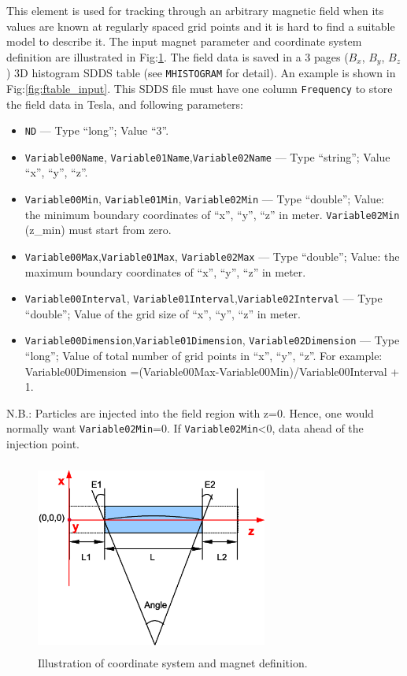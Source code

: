 This element is used for tracking through an arbitrary magnetic field
when its values are known at regularly spaced grid points and it is
hard to find a suitable model to describe it. The input magnet
parameter and coordinate system definition are illustrated in
Fig:\ref{fig:ftable_mag}. The field data is saved in a 3 pages ($B_x$,
$B_y$, $B_z$) 3D histogram SDDS table (see \verb|MHISTOGRAM| for detail).
An example is shown in Fig:\ref{fig:ftable_input}.
This SDDS file must have one column \verb|Frequency| to store the
field data in Tesla, and following parameters:

\begin{itemize} 
\item \verb|ND| --- Type ``long''; Value ``3''.
\item \verb|Variable00Name|, \verb|Variable01Name|,\verb|Variable02Name| 
      --- Type ``string''; Value ``x'', ``y'', ``z''.
\item \verb|Variable00Min|, \verb|Variable01Min|, \verb|Variable02Min|
      --- Type ``double''; Value: the minimum boundary coordinates of
      ``x'', ``y'', ``z'' in meter. \verb|Variable02Min| (z\_min) must start from zero.
\item \verb|Variable00Max|,\verb|Variable01Max|, \verb|Variable02Max| 
      --- Type ``double''; Value: the maximum boundary coordinates of 
      ``x'', ``y'', ``z'' in meter.
\item \verb|Variable00Interval|, \verb|Variable01Interval|,\verb|Variable02Interval|
      --- Type ``double''; Value of the grid size of ``x'', ``y'', ``z'' in meter.  
\item \verb|Variable00Dimension|,\verb|Variable01Dimension|, \verb|Variable02Dimension|
      --- Type ``long''; Value of total number of grid points in
      ``x'', ``y'', ``z''.  For example: Variable00Dimension
      =(Variable00Max-Variable00Min)/Variable00Interval + 1.
\end{itemize}

N.B.: Particles are injected into the field region with z=0. Hence, one would normally want
\verb|Variable02Min|=0. If \verb|Variable02Min|<0, data ahead of the injection point.

\begin{figure}[htbp] 
  \begin{center}
  \includegraphics[width=3in,height=2.5in]{ftable-fig1.eps}
  \caption{\label{fig:ftable_mag} Illustration of coordinate
      system and magnet definition.}  
   \end{center} 
\end{figure}

